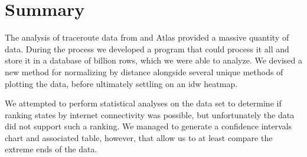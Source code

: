 \section{Summary}

The analysis of traceroute data from \caida and \ripe Atlas provided a massive quantity of data. During the process we developed a program that could process it all and store it in a database of  billion rows, which we were able to analyze. We devised a new method for normalizing by distance alongside several unique methods of plotting the data, before ultimately settling on an \acrfull{idw} heatmap.

We attempted to perform statistical analyses on the data set to determine if ranking states by internet connectivity was possible, but unfortunately the data did not support such a ranking. We managed to generate a confidence intervals chart and associated table, however, that allow us to at least compare the extreme ends of the data.